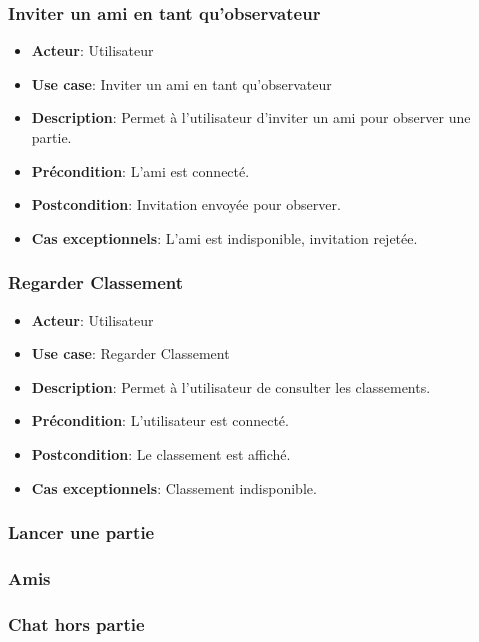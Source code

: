\documentclass{article}
\begin{document}
\subsubsection*{Inviter un ami en tant qu'observateur}
\begin{itemize}
    \item \textbf{Acteur}: Utilisateur
    \item \textbf{Use case}: Inviter un ami en tant qu'observateur
    \item \textbf{Description}: Permet à l'utilisateur d'inviter un ami pour observer une partie.
    \item \textbf{Précondition}: L'ami est connecté.
    \item \textbf{Postcondition}: Invitation envoyée pour observer.
    \item \textbf{Cas exceptionnels}: L'ami est indisponible, invitation rejetée.
\end{itemize}

\subsubsection*{Regarder Classement}
\begin{itemize}
    \item \textbf{Acteur}: Utilisateur
    \item \textbf{Use case}: Regarder Classement
    \item \textbf{Description}: Permet à l'utilisateur de consulter les classements.
    \item \textbf{Précondition}: L'utilisateur est connecté.
    \item \textbf{Postcondition}: Le classement est affiché.
    \item \textbf{Cas exceptionnels}: Classement indisponible.
\end{itemize}

\subsubsection{Lancer une partie}

\subsubsection{Amis}

\subsubsection{Chat hors partie}
\end{document}

